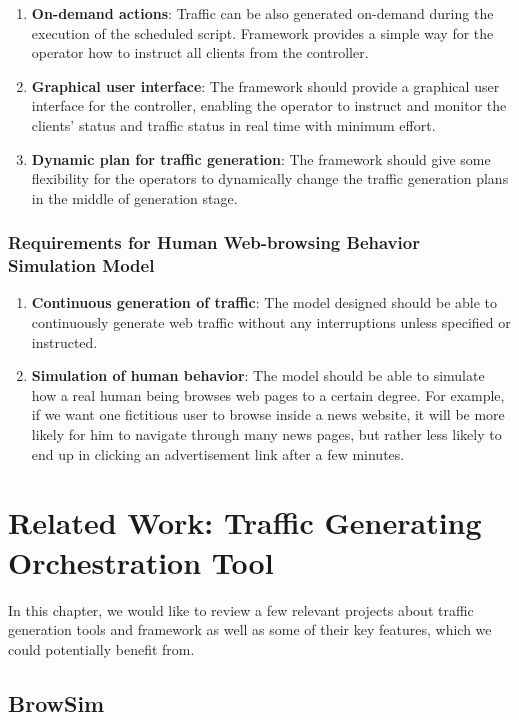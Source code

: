 \documentclass[12pt]{report}
\begin{document}
\begin{enumerate}
\item \textbf{On-demand actions}: Traffic can be also generated on-demand during the execution of the scheduled script. Framework provides a simple way for the operator how to instruct all clients from the controller.
\item \textbf{Graphical user interface}: The framework should provide a graphical user interface for the controller, enabling the operator to instruct and monitor the clients’ status and traffic status in real time with minimum effort.
\item \textbf{Dynamic plan for traffic generation}: The framework should give some flexibility for the operators to dynamically change the traffic generation plans in the middle of generation stage.
\end{enumerate}

\subsection{Requirements for Human Web-browsing Behavior Simulation Model}
\begin{enumerate}
\item \textbf{Continuous generation of traffic}: The model designed should be able to continuously generate web traffic without any interruptions unless specified or instructed. 
\item \textbf{Simulation of human behavior}: The model should be able to simulate how a real human being browses web pages to a certain degree. For example, if we want one fictitious user to browse inside a news website, it will be more likely for him to navigate through many news pages, but rather less likely to end up in clicking an advertisement link after a few minutes.

\end{enumerate}

\chapter{Related Work: Traffic Generating Orchestration Tool} \label{rw:tfo}
In this chapter, we would like to review a few relevant projects about traffic generation tools and framework as well as some of their key features, which we could potentially benefit from.

\section{BrowSim}
\end{document}
